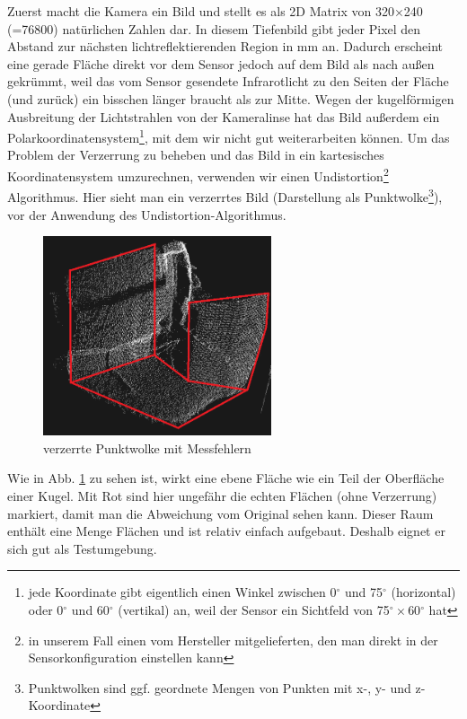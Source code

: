 \documentclass[a4paper,12pt,ngerman]{scrartcl}
\begin{document}
Zuerst macht die Kamera ein Bild und stellt es als 2D Matrix von 320$\times$240 (=76800) natürlichen Zahlen dar.
In diesem Tiefenbild gibt jeder Pixel den Abstand zur nächsten lichtreflektierenden Region in mm an. 
Dadurch erscheint eine gerade Fläche direkt vor dem Sensor jedoch auf dem Bild als nach außen gekrümmt, 
weil das vom Sensor gesendete Infrarotlicht zu den Seiten der Fläche (und zurück) ein bisschen länger
braucht als zur Mitte. Wegen der kugelförmigen Ausbreitung der Lichtstrahlen von der Kameralinse hat das
Bild außerdem ein Polarkoordinatensystem\footnote{jede Koordinate gibt eigentlich einen Winkel zwischen
	0$^{\circ}$ und 75$^{\circ}$ (horizontal) oder 0$^{\circ}$ und 60$^{\circ}$ (vertikal) an,
		weil der Sensor ein Sichtfeld von 75$^{\circ}\times$60$^{\circ}$ hat}, mit dem wir nicht
gut weiterarbeiten können. Um das Problem der Verzerrung zu beheben und das Bild in ein kartesisches
Koordinatensystem umzurechnen, verwenden wir einen Undistortion\footnote{in unserem Fall einen
	vom Hersteller mitgelieferten, den man direkt in der Sensorkonfiguration einstellen kann} Algorithmus.
Hier sieht man ein verzerrtes Bild (Darstellung als Punktwolke\footnote{Punktwolken sind ggf. geordnete Mengen
von Punkten mit x-, y- und z-Koordinate}), vor der Anwendung des Undistortion-Algorithmus.
\begin{figure}[H] \label{distorted_pointcloud_img}
	\centering
	\includegraphics[width=0.6\textwidth]{no_undistortion2}
	\caption{verzerrte Punktwolke mit Messfehlern}
\end{figure}
Wie in Abb. \ref{distorted_pointcloud_img} zu sehen ist, wirkt eine ebene Fläche wie ein Teil der Oberfläche einer Kugel. Mit Rot sind hier ungefähr die echten Flächen (ohne Verzerrung) markiert, damit man die 
Abweichung vom Original sehen kann. Dieser Raum enthält eine Menge 
Flächen und ist relativ einfach aufgebaut. Deshalb eignet er sich gut als Testumgebung.
\end{document}
